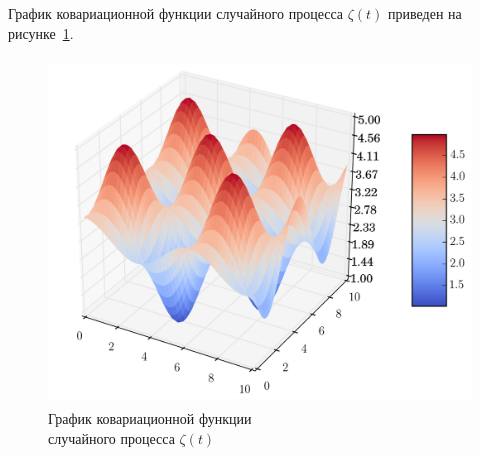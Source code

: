 График ковариационной функции случайного процесса $ \zeta(t) $ приведен на рисунке~\ref{pic:correlation}.
\begin{figure}[h]
  \centering
  \includegraphics[width=150mm, height=92mm]{pic/correlation}
  \caption{График ковариационной функции \\ случайного процесса $ \zeta(t) $}
  \label{pic:correlation} 
\end{figure}
 
\newpage
